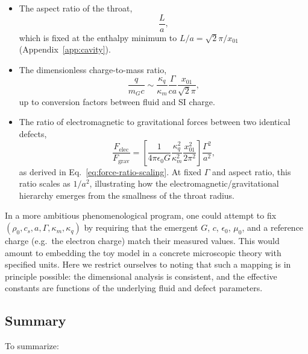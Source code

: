 \documentclass[11pt]{article}
\begin{document}
\begin{itemize}
  \item The aspect ratio of the throat,
    \begin{equation}
    \frac{L}{a},
    \end{equation}
    which is fixed at the enthalpy minimum to $L/a = \sqrt{2}\pi/x_{01}$ (Appendix~\ref{app:cavity}).

  \item The dimensionless charge-to-mass ratio,
    \begin{equation}
    \frac{q}{m_G c}
    \sim \frac{\kappa_q}{\kappa_m}
         \frac{\Gamma}{c a}
         \frac{x_{01}}{\sqrt{2}\pi},
    \end{equation}
    up to conversion factors between fluid and SI charge.

  \item The ratio of electromagnetic to gravitational forces between two identical defects,
    \begin{equation}
    \frac{F_{\mathrm{elec}}}{F_{\mathrm{grav}}}
    = \left[\frac{1}{4\pi \epsilon_0 G}
            \frac{\kappa_q^2}{\kappa_m^2}
            \frac{x_{01}^2}{2\pi^2}\right]
      \frac{\Gamma^2}{a^2},
    \end{equation}
    as derived in Eq.~\eqref{eq:force-ratio-scaling}.  At fixed $\Gamma$ and aspect ratio, this ratio scales as $1/a^2$, illustrating how the electromagnetic/gravitational hierarchy emerges from the smallness of the throat radius.
\end{itemize}

In a more ambitious phenomenological program, one could attempt to fix $(\rho_0,c_s,a,\Gamma,\kappa_m,\kappa_q)$ by requiring that the emergent $G$, $c$, $\epsilon_0$, $\mu_0$, and a reference charge (e.g.\ the electron charge) match their measured values.  This would amount to embedding the toy model in a concrete microscopic theory with specified units.  Here we restrict ourselves to noting that such a mapping is in principle possible: the dimensional analysis is consistent, and the effective constants are functions of the underlying fluid and defect parameters.

\subsection{Summary}

To summarize:
\end{document}
